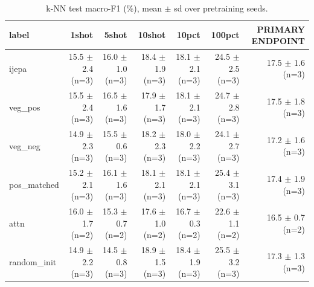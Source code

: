 \begin{table}[t]
\centering
\small
\caption{k-NN test macro-F1 (\%), mean $\pm$ sd over pretraining seeds.}
\label{tab:main_results_knn}
\begin{tabular}{lrrrrrr}
\toprule
label & 1shot & 5shot & 10shot & 10pct & 100pct & PRIMARY ENDPOINT \\
\midrule
ijepa & 15.5 $\pm$ 2.4 (n=3) & 16.0 $\pm$ 1.0 (n=3) & 18.4 $\pm$ 1.9 (n=3) & 18.1 $\pm$ 2.1 (n=3) & 24.5 $\pm$ 2.5 (n=3) & 17.5 $\pm$ 1.6 (n=3) \\
veg\_pos & 15.5 $\pm$ 2.4 (n=3) & 16.5 $\pm$ 1.6 (n=3) & 17.9 $\pm$ 1.7 (n=3) & 18.1 $\pm$ 2.1 (n=3) & 24.7 $\pm$ 2.8 (n=3) & 17.5 $\pm$ 1.8 (n=3) \\
veg\_neg & 14.9 $\pm$ 2.3 (n=3) & 15.5 $\pm$ 0.6 (n=3) & 18.2 $\pm$ 2.3 (n=3) & 18.0 $\pm$ 2.2 (n=3) & 24.1 $\pm$ 2.7 (n=3) & 17.2 $\pm$ 1.6 (n=3) \\
pos\_matched & 15.2 $\pm$ 2.1 (n=3) & 16.1 $\pm$ 1.6 (n=3) & 18.1 $\pm$ 2.1 (n=3) & 18.1 $\pm$ 2.1 (n=3) & 25.4 $\pm$ 3.1 (n=3) & 17.4 $\pm$ 1.9 (n=3) \\
attn & 16.0 $\pm$ 1.7 (n=2) & 15.3 $\pm$ 0.7 (n=2) & 17.6 $\pm$ 1.0 (n=2) & 16.7 $\pm$ 0.3 (n=2) & 22.6 $\pm$ 1.1 (n=2) & 16.5 $\pm$ 0.7 (n=2) \\
random\_init & 14.9 $\pm$ 2.2 (n=3) & 14.5 $\pm$ 0.8 (n=3) & 18.9 $\pm$ 1.5 (n=3) & 18.4 $\pm$ 1.9 (n=3) & 25.5 $\pm$ 3.2 (n=3) & 17.3 $\pm$ 1.3 (n=3) \\
\bottomrule
\end{tabular}
\end{table}
